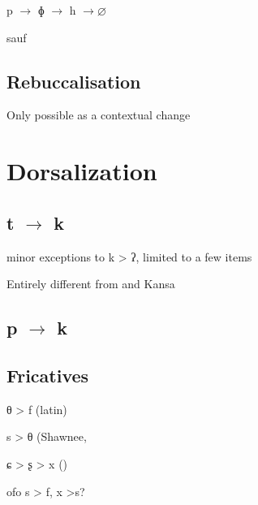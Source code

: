 \documentclass[oldfontcommands,oneside,a4paper,11pt]{article}
\newcommand{\ipa}[1]{{\phon \mbox{#1}}} %
\begin{document}
\ipa{p} $\rightarrow$ \ipa{ɸ} $\rightarrow$  \ipa{h}   $\rightarrow \varnothing $
 
sauf \citet{thurneysen21pl} 
 
 
 
  \subsection{Rebuccalisation}   \label{sec:rebucc}
Only possible as a contextual change

\citet{michaud06neutralisation}


 \section{Dorsalization}  \label{sec:dorsal}

\subsection{\ipa{t} $\rightarrow$ \ipa{k}}  \label{sec:tk}
\citet{blust04tk}

\citet{donohue06tk}

\citet[393]{blust04tk} minor exceptions to k > ʔ, limited to a few items

Entirely different from \citet{haas68chipewyan}
and Kansa

\subsection{\ipa{p} $\rightarrow$ \ipa{k}} \label{sec:pk}

\citet{goddard74arapaho}


\subsection{Fricatives} \label{sec:fric.change}


θ > f (latin)

s > θ (Shawnee, 


ɕ > ʂ > x (\citet{jacques11lingua})


ofo s > f, x >s?







\end{document}
